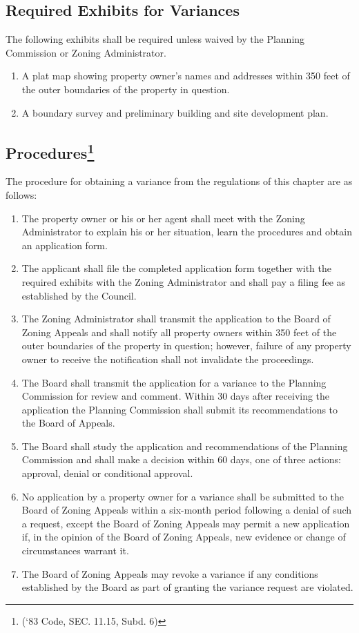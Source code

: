 \subsection{Required Exhibits for Variances}
The following exhibits shall be required unless waived by the Planning Commission or Zoning Administrator.
\begin{enumerate}[{\indent}1)]
    \item A plat map showing property owner’s names and addresses within 350 feet of the outer boundaries of the property in question.
    \item A boundary survey and preliminary building and site development plan.
\end{enumerate}
\subsection{Procedures\footnote{(‘83 Code, SEC. 11.15, Subd. 6)}}
The procedure for obtaining a variance from the regulations of this chapter are as follows:
\begin{enumerate}[{\indent}1)]
    \item The property owner or his or her agent shall meet with the Zoning Administrator to explain his or her situation, learn the procedures and obtain an application form.
    \item The applicant shall file the completed application form together with the required exhibits with the Zoning Administrator and shall pay a filing fee as established by the Council.
    \item The Zoning Administrator shall transmit the application to the Board of Zoning Appeals and shall notify all property owners within 350 feet of the outer boundaries of the property in question; however, failure of any property owner to receive the notification shall not invalidate the proceedings.
    \item The Board shall transmit the application for a variance to the Planning Commission for review and comment. Within 30 days after receiving the application the Planning Commission shall submit its recommendations to the Board of Appeals.
    \item The Board shall study the application and recommendations of the Planning Commission and shall make a decision within 60 days, one of three actions: approval, denial or conditional approval.
    \item No application by a property owner for a variance shall be submitted to the Board of Zoning Appeals within a six-month period following a denial of such a request, except the Board of Zoning Appeals may permit a new application if, in the opinion of the Board of Zoning Appeals, new evidence or change of circumstances warrant it.
    \item The Board of Zoning Appeals may revoke a variance if any conditions established by the Board as part of granting the variance request are violated.
\end{enumerate}

